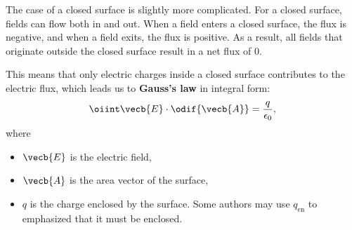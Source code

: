 The case of a closed surface is slightly more complicated.
For a closed surface, fields can flow both in and out.
When a field enters a closed surface, the flux is negative,
and when a field exits, the flux is positive.
As a result,
all fields that originate outside the closed surface result in a net flux of 0.

This means that only electric charges inside a closed surface
contributes to the electric flux,
which leads us to \textbf{Gauss's law} in integral form:
\begin{equation} \label{eq:gausss-law}
    \oiint \vecb{E} \cdot \odif{\vecb{A}} = \frac{q}{\epsilon_0},
\end{equation}
where
\begin{itemize}
    \item \(\vecb{E}\) is the electric field,
    \item \(\vecb{A}\) is the area vector of the surface,
    \item \(q\) is the charge enclosed by the surface.
        Some authors may use \(q_\mathrm{en}\)
        to emphasized that it must be enclosed.
\end{itemize}

